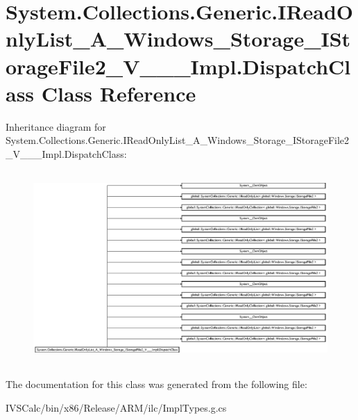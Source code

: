 \hypertarget{class_system_1_1_collections_1_1_generic_1_1_i_read_only_list___a___windows___storage___i_storag22146291d58bff564a1101ed92851d92}{}\section{System.\+Collections.\+Generic.\+I\+Read\+Only\+List\+\_\+\+A\+\_\+\+Windows\+\_\+\+Storage\+\_\+\+I\+Storage\+File2\+\_\+\+V\+\_\+\+\_\+\+\_\+\+Impl.\+Dispatch\+Class Class Reference}
\label{class_system_1_1_collections_1_1_generic_1_1_i_read_only_list___a___windows___storage___i_storag22146291d58bff564a1101ed92851d92}
Inheritance diagram for System.\+Collections.\+Generic.\+I\+Read\+Only\+List\+\_\+\+A\+\_\+\+Windows\+\_\+\+Storage\+\_\+\+I\+Storage\+File2\+\_\+\+V\+\_\+\+\_\+\+\_\+\+Impl.\+Dispatch\+Class\+:\begin{figure}[H]
\begin{center}
\leavevmode
\includegraphics[height=7.392739cm]{class_system_1_1_collections_1_1_generic_1_1_i_read_only_list___a___windows___storage___i_storag22146291d58bff564a1101ed92851d92}
\end{center}
\end{figure}


The documentation for this class was generated from the following file\+:\begin{DoxyCompactItemize}
\item 
I\+V\+S\+Calc/bin/x86/\+Release/\+A\+R\+M/ilc/Impl\+Types.\+g.\+cs\end{DoxyCompactItemize}
